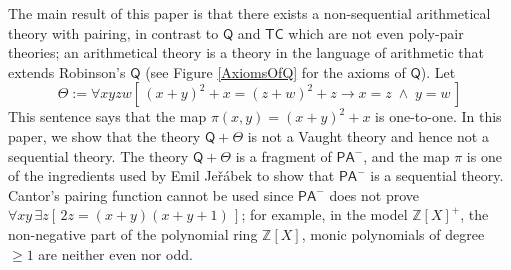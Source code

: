 \documentclass[10pt,a4paper, openany,  oldfontcommands]{memoir}
\newtheorem{open problem} [theorem] {Open Problem}
\newtheorem{open question} [theorem] {Open Question}
\begin{document}
The main result of this paper is that there exists a non-sequential arithmetical theory with pairing, in contrast to $  \mathsf{Q} $  and  $  \mathsf{TC} $ which   are  not    even poly-pair theories;  
an arithmetical theory is a theory in the language of arithmetic that extends   Robinson's   $\mathsf{Q} $
(see Figure  \ref{AxiomsOfQ}  for the axioms of  $  \mathsf{Q} $). 
Let  
\[
\Theta :=   \forall xy z w  \left[  \,   (x+y)^2 + x = (z+w)^2 + z \rightarrow x = z  \;  \wedge  \;  y = w  \,  \right] 
\]
This sentence  says that the map  $  \pi  (x, y ) = (x+y)^2 + x $ is one-to-one. 
In this paper,  we show that  the theory  $  \mathsf{Q} + \Theta $  is not a Vaught theory and hence not a sequential theory. 
The theory  $  \mathsf{Q} + \Theta $  is a fragment of  $  \mathsf{PA}^- $,   and the map $ \pi $ is one of the ingredients used by 
Emil   Jeřábek \cite{Jerabek2012} to show that    $ \mathsf{PA^-} $  is  a  sequential theory. 
Cantor's pairing function cannot be used since   $  \mathsf{PA}^- $  does not prove
 $ \forall x y  \,  \exists z   \left[  \,   2z = (x+y) (x+y+1) \,   \right]  $; 
for example, in the model $  \mathbb{Z}  \left[ X \right]^+ $, the non-negative part of the polynomial ring   $ \mathbb{Z}  \left[ X \right] $, 
monic polynomials of degree $  \geq 1  $ are neither even nor odd. 











 
\end{document}
